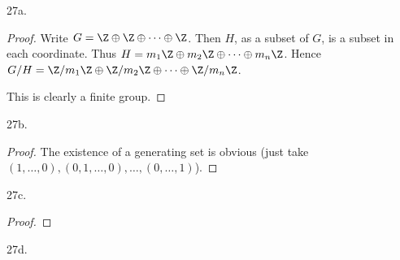 \documentclass[a4paper]{article}
\begin{document}
27a.

\begin{proof}
	Write $G = \Z \oplus \Z \oplus \cdots \oplus \Z $.
	Then $H $, as a subset of $G $, is a subset in each coordinate.
	Thus $H = m_{1}\Z \oplus m_{2}\Z \oplus \cdots \oplus m_n\Z$.
	Hence $G / H = \Z / m_{1} \Z \oplus \Z / m_{2}\Z \oplus \cdots \oplus \Z / m_n\Z$.

	This is clearly a finite group.
\end{proof}

27b.

\begin{proof}
	The existence of a generating set is obvious (just take $(1,\ldots,0),(0,1,\ldots ,0),\ldots ,(0,\ldots ,1) $).
\end{proof}

27c.

\begin{proof}

\end{proof}

27d.
\end{document}
